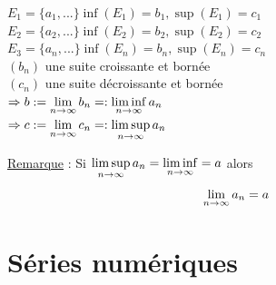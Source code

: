 \documentclass[12pt,a4paper]{article}
\begin{document}
{\begin{boite}
$E_1 = \{a_1,...\} \inf(E_1) = b_1, \sup(E_1) = c_1$\\
$E_2 = \{a_2,...\} \inf(E_2) = b_2, \sup(E_2) = c_2$\\
$E_3 = \{a_n,...\} \inf(E_n) = b_n, \sup(E_n) = c_n$\\
$(b_n)$ une suite croissante et bornée\\
$(c_n)$ une suite décroissante et bornée\\
$\Rightarrow b := \lim\limits_{n \to \infty} b_n =: \liminf\limits_{n \to \infty} a_n$\\
$\Rightarrow c := \lim\limits_{n \to \infty} c_n =: \limsup\limits_{n \to \infty} a_n$\\
\end{boite}
\begin{boite}
\underline{Remarque} : Si $\limsup\limits_{n \to \infty} a_n = \liminf\limits_{n \to \infty} = a$ alors 
\begin{equation}
\lim\limits_{n \to \infty} a_n =a
\end{equation}
\end{boite}
\section{Séries numériques}
\setcounter{equation}{0}
}
\end{document}
